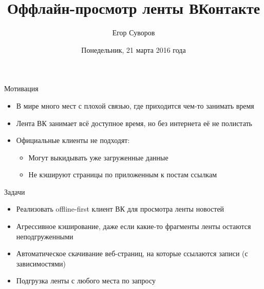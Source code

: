 \documentclass[utf8,xcolor=table]{beamer}
\title{Оффлайн-просмотр ленты ВКонтакте}
\author{Егор Суворов}
\institute[СПб АУ]{Практика, осень 2015--зима 2016}
\date[21.03.2016]{Понедельник, 21 марта 2016 года}
\begin{document}
\begin{frame}
\titlepage
\end{frame}

\begin{frame}[t]{Мотивация}
	\begin{itemize}
		\item В мире много мест с плохой связью, где приходится чем-то занимать время
		\item Лента ВК занимает всё доступное время, но без интернета её не полистать
		\item Официальные клиенты не подходят:
			\begin{itemize}
				\item Могут выкидывать уже загруженные данные
				\item Не кэшируют страницы по приложенным к постам ссылкам
			\end{itemize}
	\end{itemize}
\end{frame}

\begin{frame}[t]{Задачи}
	\begin{itemize}
		\item Реализовать offline-first клиент ВК для просмотра ленты новостей
		\item Агрессивное кэширование, даже если какие-то фрагменты ленты остаются неподгруженными
		\item Автоматическое скачивание веб-страниц, на которые ссылаются записи (с зависимостями)
		\item Подгрузка ленты с любого места по запросу
	\end{itemize}
\end{frame}
\end{document}
